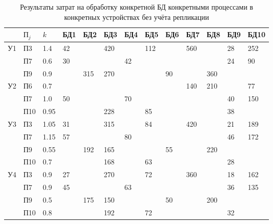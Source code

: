 \documentclass[russian,utf8,emptystyle]{eskdtext}
\begin{document}
\clearpage
\begin{longtable}{p{0.6cm}|p{1cm}|p{1cm}|p{1cm}|p{1cm}|p{1cm}|p{1cm}|p{1cm}|p{1cm}|p{1cm}|p{1cm}|p{1cm}|p{1cm}}
\caption{Результаты затрат на обработку конкретной БД конкретными процессами в конкретных
устройствах без учёта репликации}
\label{tab:bd-3} \\
                   &$\text{П}_j$ & $k$   & БД1 &  БД2 &  БД3 &  БД4 &  БД5 &  БД6 &  БД7 &  БД8 &  БД9 &  БД10 \\
\hline
\multirow{3}{*}{У1}&  П3         & 1.4   & 42  &      & 420  &      & 112  &      & 560  &      & 28   &  252  \\
                   &  П7         & 0.6   & 30  &      &      & 42   &      &      &      &      & 24   &  90   \\
                   &  П9         & 0.9   &     & 315  & 270  &      &      & 90   &      & 360  &      &       \\
\hline
\multirow{3}{*}{У2}&  П6         & 0.7   &     &      &      &      &      &      & 140  & 210  &      & 77    \\
                   &  П7         & 1.0   & 50  &      &      & 70   &      &      &      &      & 40   & 150   \\
                   &  П10        & 0.95  &     &      & 228  &      & 85   &      &      &      & 38   &       \\
\hline
\multirow{4}{*}{У3}&  П3         & 1.05  & 31  &      & 315  &      & 84   &      & 420  &      & 21   & 189   \\
                   &  П7         & 1.15  & 57  &      &      & 80   &      &      &      &      & 46   & 172   \\
                   &  П9         & 0.55  &     & 192  & 165  &      &      & 55   &      & 220  &      &       \\
                   &  П10        & 0.7   &     &      & 168  &      & 63   &      &      &      & 28   &       \\
\hline
\multirow{4}{*}{У4}&  П3         & 0.9   & 27  &      & 270  &      & 72   &      & 360  &      & 18   & 162   \\
                   &  П7         & 0.9   & 45  &      &      & 63   &      &      &      &      & 36   & 135   \\
                   &  П9         & 0.5   &     & 175  & 150  &      &      & 50   &      & 200  &      &       \\
                   &  П10        & 0.8   &     &      & 192  &      & 72   &      &      &      & 32   &       \\

\end{longtable}
\end{document}
